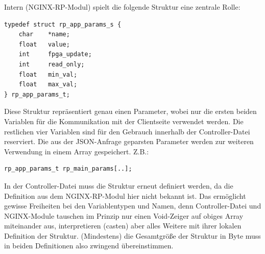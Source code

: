 \documentclass[11pt]{scrartcl}
\begin{document}
Intern (NGINX-RP-Modul) spielt die folgende Struktur eine zentrale Rolle:
\begin{lstlisting}
typedef struct rp_app_params_s {
    char  	*name;
    float 	value;
    int 	fpga_update;
    int    	read_only;
    float  	min_val;
    float	max_val;
} rp_app_params_t;
\end{lstlisting}
Diese Struktur repräsentiert genau einen Parameter, wobei nur die ersten beiden Variablen für die Kommunikation mit der Clientseite verwendet werden. Die restlichen vier Variablen sind für den Gebrauch innerhalb der Controller-Datei reserviert. Die aus der JSON-Anfrage geparsten Parameter werden zur weiteren Verwendung in einem Array gespeichert. Z.B.:
\begin{lstlisting}
rp_app_params_t rp_main_params[..];	
\end{lstlisting}
In der Controller-Datei muss die Struktur erneut definiert werden, da die Definition aus dem NGINX-RP-Modul hier nicht bekannt ist. Das ermöglicht gewisse Freiheiten bei den Variablentypen und Namen, denn Controller-Datei und NGINX-Module tauschen im Prinzip nur einen Void-Zeiger auf obiges Array miteinander aus, interpretieren (casten) aber alles Weitere mit ihrer lokalen Definition der Struktur. (Mindestens) die Gesamtgröße der Struktur in Byte muss in beiden Definitionen also zwingend übereinstimmen.\\
\end{document}
